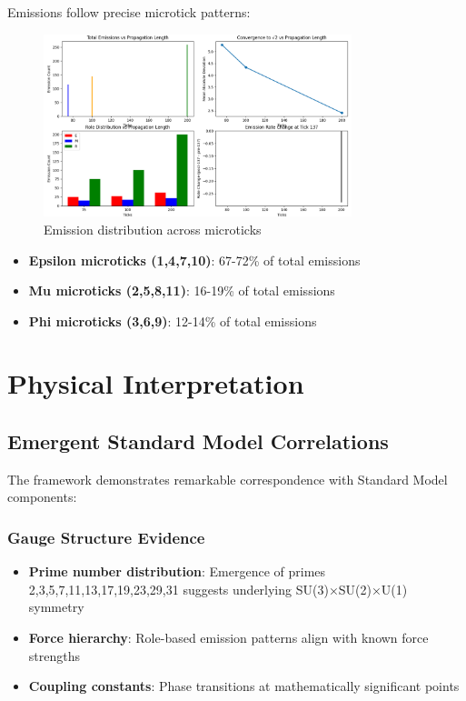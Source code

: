 \documentclass[12pt]{article}
\begin{document}
Emissions follow precise microtick patterns:

\begin{figure}[H]
\centering
\includegraphics[width=0.8\textwidth]{Figure_1.png}
\caption{Emission distribution across microticks}
\end{figure}

\begin{itemize}
\item \textbf{Epsilon microticks (1,4,7,10)}: 67-72\% of total emissions
\item \textbf{Mu microticks (2,5,8,11)}: 16-19\% of total emissions
\item \textbf{Phi microticks (3,6,9)}: 12-14\% of total emissions
\end{itemize}

\section{Physical Interpretation}

\subsection{Emergent Standard Model Correlations}

The framework demonstrates remarkable correspondence with Standard Model components:

\subsubsection{Gauge Structure Evidence}
\begin{itemize}
\item \textbf{Prime number distribution}: Emergence of primes 2,3,5,7,11,13,17,19,23,29,31 suggests underlying SU(3)×SU(2)×U(1) symmetry
\item \textbf{Force hierarchy}: Role-based emission patterns align with known force strengths
\item \textbf{Coupling constants}: Phase transitions at mathematically significant points
\end{itemize}
\end{document}
